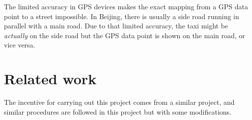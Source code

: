 The limited accuracy in GPS devices makes the exact mapping from a GPS data point to a street impossible. In Beijing, there is usually a side road running in parallel with a main road. Due to that limited accuracy, the taxi might be \emph{actually} on the side road but the GPS data point is shown on the main road, or vice versa. 

\section{Related work}
The incentive for carrying out this project comes from a similar project\cite{TDR10}, and similar procedures are followed in this project but with some modifications. 


